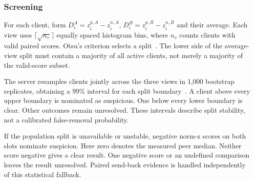 \documentclass[journal]{IEEEtran}
\begin{document}
\subsubsection{Screening}
For each client, form $D_i^A=z_i^{p,A}-z_i^{n,A}$,
$D_i^B=z_i^{p,B}-z_i^{n,B}$ and their average. Each view uses
$\lceil\sqrt{n_v}\rceil$ equally spaced histogram bins, where $n_v$ counts
clients with valid paired scores. Otsu's criterion selects a
split~\cite{otsu1979threshold}. The lower side of the average-view split
must contain a majority of all active clients, not merely a majority of
the valid-score subset.

The server resamples clients jointly across the three views in 1,000
bootstrap replicates, obtaining a 99\% interval for each split
boundary~\cite{efron1979bootstrap}. A client above every upper boundary
is nominated as suspicious. One below every lower boundary is clear.
Other outcomes remain unresolved. These intervals describe split
stability, not a calibrated false-removal probability.

If the population split is unavailable or unstable, negative norm-z scores
on both slots nominate suspicion. Here zero denotes the measured peer
median. Neither score negative gives a clear result. One negative score
or an undefined comparison leaves the result unresolved. Paired send-back evidence is handled
independently of this statistical fallback.
\end{document}
